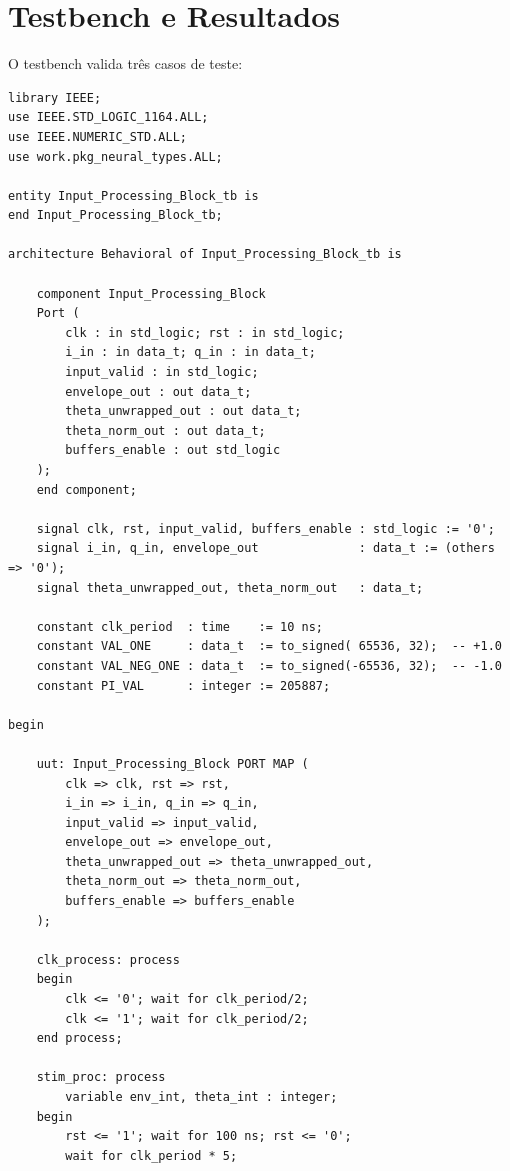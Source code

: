 \documentclass[a4paper,12pt]{article}
\begin{document}
\section{Testbench e Resultados}

O testbench valida tr\^es casos de teste:

\begin{lstlisting}[style=vhdlstyle,
    caption={Testbench do \texttt{Input\_Processing\_Block}.},
    label={lst:tb}]
library IEEE;
use IEEE.STD_LOGIC_1164.ALL;
use IEEE.NUMERIC_STD.ALL;
use work.pkg_neural_types.ALL;

entity Input_Processing_Block_tb is
end Input_Processing_Block_tb;

architecture Behavioral of Input_Processing_Block_tb is

    component Input_Processing_Block
    Port (
        clk : in std_logic; rst : in std_logic;
        i_in : in data_t; q_in : in data_t;
        input_valid : in std_logic;
        envelope_out : out data_t;
        theta_unwrapped_out : out data_t;
        theta_norm_out : out data_t;
        buffers_enable : out std_logic
    );
    end component;

    signal clk, rst, input_valid, buffers_enable : std_logic := '0';
    signal i_in, q_in, envelope_out              : data_t := (others => '0');
    signal theta_unwrapped_out, theta_norm_out   : data_t;

    constant clk_period  : time    := 10 ns;
    constant VAL_ONE     : data_t  := to_signed( 65536, 32);  -- +1.0
    constant VAL_NEG_ONE : data_t  := to_signed(-65536, 32);  -- -1.0
    constant PI_VAL      : integer := 205887;

begin

    uut: Input_Processing_Block PORT MAP (
        clk => clk, rst => rst,
        i_in => i_in, q_in => q_in,
        input_valid => input_valid,
        envelope_out => envelope_out,
        theta_unwrapped_out => theta_unwrapped_out,
        theta_norm_out => theta_norm_out,
        buffers_enable => buffers_enable
    );

    clk_process: process
    begin
        clk <= '0'; wait for clk_period/2;
        clk <= '1'; wait for clk_period/2;
    end process;

    stim_proc: process
        variable env_int, theta_int : integer;
    begin
        rst <= '1'; wait for 100 ns; rst <= '0';
        wait for clk_period * 5;


\end{lstlisting}
\end{document}

